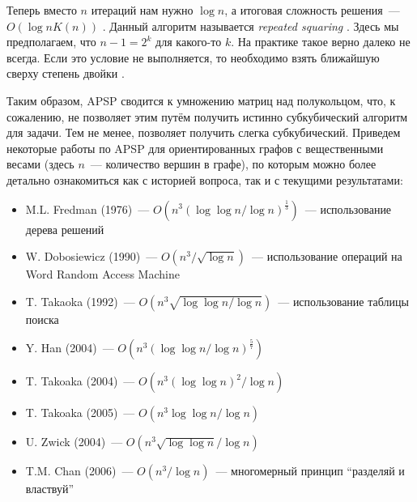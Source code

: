  Теперь вместо $n$ итераций нам нужно $\log{n}$, а итоговая сложность решения~--- $O(\log{n} K(n))$%
 .
 Данный алгоритм называется \emph{repeated squaring}%
 .
 Здесь мы предполагаем, что $n-1 = 2^k$ для какого-то $k$.
 На практике такое верно далеко не всегда.
 Если это условие не выполняется, то необходимо взять ближайшую сверху степень двойки%
 .

 Таким образом, APSP сводится к умножению матриц над полукольцом, что, к сожалению, не позволяет этим путём получить истинно субкубический алгоритм для задачи.
 Тем не менее, позволяет получить слегка субкубический.
 Приведем некоторые работы по APSP для ориентированных графов с вещественными весами (здесь $n$~--- количество вершин в графе), по которым можно более детально ознакомиться как с историей вопроса, так и с текущими результатами:
 \begin{itemize}
     \item M.L. Fredman (1976)~--- $O(n^3(\log \log n / \log n)^\frac{1}{3})$~--- использование дерева решений~
     \item W. Dobosiewicz (1990)~--- $O(n^3 / \sqrt{\log n})$~--- использование операций на Word Random Access Machine~
     \item T. Takaoka (1992)~--- $O(n^3 \sqrt{\log \log n / \log n})$~--- использование таблицы поиска~
     \item Y. Han (2004)~--- $O(n^3 (\log \log n / \log n)^\frac{5}{7})$~
     \item T. Takoaka (2004)~--- $O(n^3 (\log \log n)^2 / \log n)$~
     \item T. Takoaka (2005)~--- $O(n^3 \log \log n / \log n)$~
     \item U. Zwick (2004)~--- $O(n^3 \sqrt{\log \log n} / \log n)$~
     \item T.M. Chan (2006)~--- $O(n^3 / \log n)$~--- многомерный принцип \enquote{разделяй и властвуй}~
 \end{itemize}

